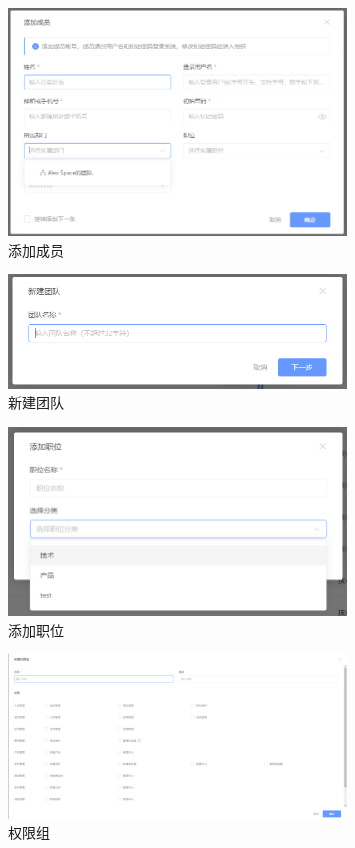 \documentclass[12pt, a4paper, oneside]{ctexart}
\begin{document}
\begin{figure}[H]
    \centering
	\includegraphics[width=0.8\textwidth]{../pic/1/1.1.png}
    \caption{添加成员}
\end{figure}
\begin{figure}[H]
	\centering
	\includegraphics[width=0.8\textwidth]{../pic/1/1.2.png}
    \caption{新建团队}
\end{figure}
\begin{figure}[H]
		\centering
		\includegraphics[width=0.8\textwidth]{../pic/1/1.3.png}
        \caption{添加职位}
\end{figure}\begin{figure}[H]
    \centering
    \includegraphics[width=0.8\textwidth]{../pic/1/1.4.png}
    \caption{权限组}
\end{figure}
\end{document}
